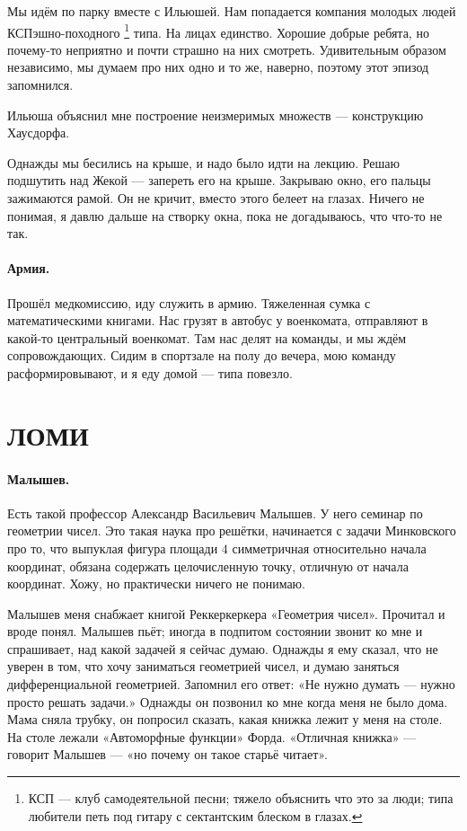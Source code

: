 \documentclass{book}
\begin{document}
Мы идём по парку вместе с Ильюшей.
Нам попадается компания молодых людей КСПэшно-походного%
\footnote{КСП --- клуб самодеятельной песни; тяжело объяснить что это за люди; 
типа любители петь под гитару с сектантским блеском в глазах.}
типа.
На лицах единство.
Хорошие добрые ребята, 
но почему-то неприятно и почти страшно на них смотреть.
Удивительным образом независимо, мы думаем про них одно и то же,
наверно, поэтому этот эпизод запомнился.

Ильюша объяснил мне построение неизмеримых множеств ---
конструкцию Хаусдорфа.

Однажды мы бесились на крыше, и надо было идти на лекцию.
Решаю подшутить над Жекой --- запереть его на крыше.
Закрываю окно, 
его пальцы зажимаются рамой.
Он не кричит, вместо этого белеет на глазах.
Ничего не понимая, я давлю дальше на створку окна, 
пока не догадываюсь, что что-то не так.

\paragraph{Армия.}
Прошёл медкомиссию, иду служить в армию.
Тяжеленная сумка с математическими книгами.
Нас грузят в автобус у военкомата, отправляют в какой-то центральный военкомат.
Там нас делят на команды, и мы ждём сопровождающих.
Сидим в спортзале на полу до вечера, мою команду расформировывают, и я еду домой --- типа повезло.

\section*{ЛОМИ}

\paragraph{Малышев.}
Есть такой профессор Александр Васильевич Малышев. 
У него семинар по геометрии чисел.
Это такая наука про решётки, начинается с задачи Минковского про то, что выпуклая фигура площади $4$ симметричная относительно начала координат, обязана содержать целочисленную точку, отличную от начала координат.
Хожу, но практически ничего не понимаю.

Малышев меня снабжает книгой Реккеркеркера «Геометрия чисел».
Прочитал и вроде понял.
Малышев пьёт;
иногда в подпитом состоянии звонит ко мне и спрашивает, над какой задачей я сейчас думаю.
Однажды я ему сказал, что не уверен в том, что хочу заниматься геометрией чисел, и думаю заняться дифференциальной геометрией.
Запомнил его ответ: «Не нужно думать --- нужно просто решать задачи.»
Однажды он позвонил ко мне когда меня не было дома.
Мама сняла трубку,
он попросил сказать, какая книжка лежит у меня на столе.
На столе лежали «Автоморфные функции» Форда.
«Отличная книжка» --- говорит Малышев --- «но почему он такое старьё читает».
\end{document}
